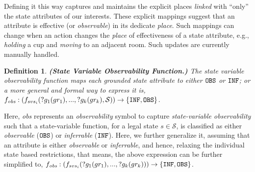 \documentclass[letterpaper]{article} %
\newtheorem{definition}{Definition}
\begin{document}
Defining it this way captures and maintains the explicit places \textit{linked} with ``only'' the state attributes of our interests. 
These explicit mappings suggest that an attribute is effective (or \textit{observable}) in its dedicate \textit{place}.
Such mappings can change when an action changes the \textit{place} of effectiveness of a state attribute, e.g., 
\textit{holding} a cup and \textit{moving} to an adjacent room. Such updates are currently manually handled.


\begin{definition}
\textbf{(State Variable Observability Function.)} 
The state variable observability function maps each grounded state attribute 
to either $\texttt{OBS}$ or $\texttt{INF}$; or a more general and formal way to express it is, $f_{\textit{obs}}: (f_{svs_i}(?g_1(gr_1),...,?g_k(gr_k),\mathcal{S}
)) \rightarrow 
    \{\texttt{INF}, \texttt{OBS}\}$.
    \label{def:svof}
\end{definition}
Here, \textit{obs} represents an \textit{observability} symbol to capture \textit{state-variable observability} such that a state-variable function, for a legal state $s\in\mathcal{S}$, is classified as either \textit{observable} ($\texttt{OBS}$) or \textit{inferrable} ($\texttt{INF}$). 
Here, we further generalize it, assuming that an attribute is either \textit{observable} or \textit{inferrable}, and hence, relaxing the individual state based restrictions, that means, the above expression can be further simplified to, $f_{\textit{obs}}: (f_{svs_i}(?g_1(gr_1),...,?g_k(gr_k))) \rightarrow 
    \{\texttt{INF}, \texttt{OBS}\}$.

\end{document}
